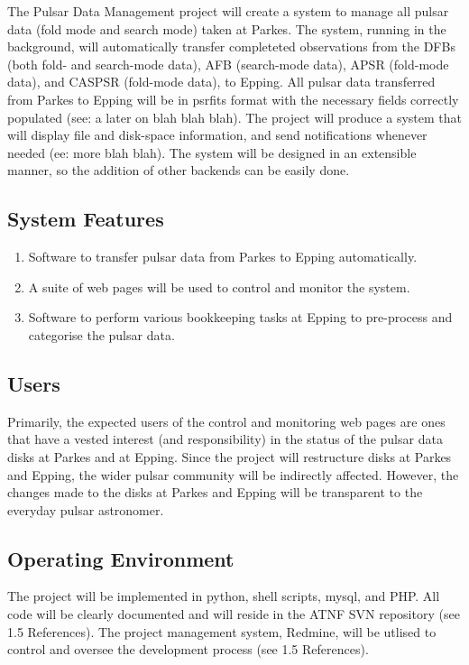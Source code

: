 \documentclass[a4paper,11pt]{article}
\begin{document}
The Pulsar Data Management project will create a system to manage all pulsar data (fold mode and search mode) taken at Parkes. The system, running in the background, will automatically transfer completeted observations from the DFBs (both fold- and search-mode data), AFB (search-mode data), APSR (fold-mode data), and CASPSR (fold-mode data), to Epping. All pulsar data transferred from Parkes to Epping will be in psrfits format with the necessary fields correctly populated (see: a later on blah blah blah). The project will produce a system that will display file and disk-space information, and send notifications whenever needed (ee: more blah blah). The system will be designed in an extensible manner, so the addition of other backends can be easily done.

\subsection{System Features}
\begin{enumerate}
\item Software to transfer pulsar data from Parkes to Epping automatically.
\item A suite of web pages will be used to control and monitor the system.
\item Software to perform various bookkeeping tasks at Epping to pre-process and categorise the pulsar data.
\end{enumerate}

\subsection{Users}
Primarily, the expected users of the control and monitoring web pages are ones that have a vested interest (and responsibility) in the status of the pulsar data disks at Parkes and at Epping. Since the project will restructure disks at Parkes and Epping, the wider pulsar community will be indirectly affected. However, the changes made to the disks at Parkes and Epping will be transparent to the everyday pulsar astronomer.

\subsection{Operating Environment}
The project will be implemented in python, shell scripts, mysql, and PHP. All code will be clearly documented and will reside in the ATNF SVN repository (see 1.5 References). The project management system, Redmine, will be utlised to control and oversee the development process (see 1.5 References).
\end{document}

